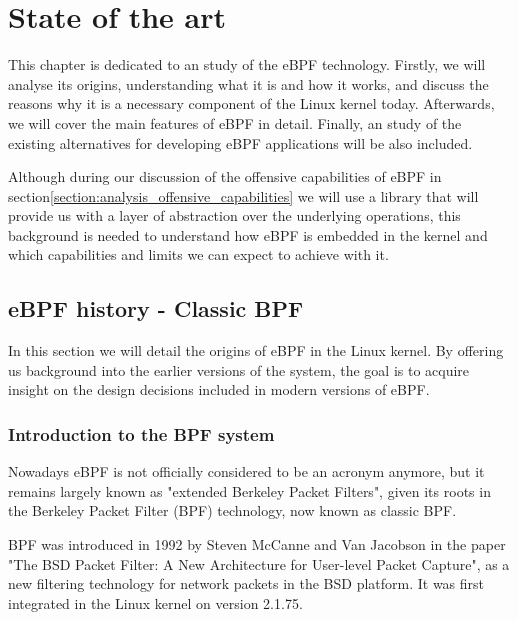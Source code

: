 \documentclass[12pt]{report} %
\begin{document}
\chapter{State of the art}
This chapter is dedicated to an study of the eBPF technology. Firstly, we will analyse its origins, understanding what it is and how it works, and discuss the reasons why it is a necessary component of the Linux kernel today. Afterwards, we will cover the main features of eBPF in detail. Finally, an study of the existing alternatives for developing eBPF applications will be also included.

Although during our discussion of the offensive capabilities of eBPF in section\ref{section:analysis_offensive_capabilities} we will use a library that will provide us with a layer of abstraction over the underlying operations, this background is needed to understand how eBPF is embedded in the kernel and which capabilities and limits we can expect to achieve with it.

\section{eBPF history - Classic BPF}
In this section we will detail the origins of eBPF in the Linux kernel. By offering us background into the earlier versions of the system, the goal is to acquire insight on the design decisions included in modern versions of eBPF.

\subsection{Introduction to the BPF system}
Nowadays eBPF is not officially considered to be an acronym anymore\cite{ebpf_io}, but it remains largely known as "extended Berkeley Packet Filters", given its roots in the Berkeley Packet Filter (BPF) technology, now known as classic BPF.

BPF was introduced in 1992 by Steven McCanne and Van Jacobson in the paper "The BSD Packet Filter: A New Architecture for User-level Packet Capture"\cite{bpf_bsd_origin}, as a new filtering technology for network packets in the BSD platform. It was first integrated in the Linux kernel on version 2.1.75\cite{ebpf_history_opensource}.
\end{document}
